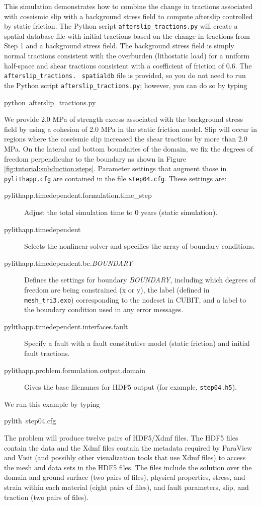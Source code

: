 This simulation demonstrates how to combine the change in tractions
associated with coseismic slip with a background stress field to compute
afterslip controlled by static friction. The Python script \texttt{afterslip\_tractions.py}
will create a spatial database file with initial tractions based on
the change in tractions from Step 1 and a background stress field.
The background stress field is simply normal tractions consistent
with the overburden (lithostatic load) for a uniform half-space and
shear tractions consistent with a coefficient of friction of 0.6.
The \texttt{afterslip\_tractions.}~\linebreak{}
\texttt{spatialdb} file is provided, so you do not need to run the
Python script \texttt{afterslip\_tractions.py}; however, you can do
so by typing
\begin{lyxcode}
python~afterslip\_tractions.py
\end{lyxcode}
We provide 2.0 MPa of strength excess associated with the background
stress field by using a cohesion of 2.0 MPa in the static friction
model. Slip will occur in regions where the coseismic slip increased
the shear tractions by more than 2.0 MPa. On the lateral and bottom
boundaries of the domain, we fix the degrees of freedom perpendicular
to the boundary as shown in Figure \vref{fig:tutorial:subduction:steps}.
Parameter settings that augment those in \texttt{pylithapp.cfg} are
contained in the file \texttt{step04.cfg}. These settings are:
\begin{description}
\item [{pylithapp.timedependent.formulation.time\_step}] Adjust the total
simulation time to 0 years (static simulation).
\item [{pylithapp.timedependent}] Selects the nonlinear solver and specifies
the array of boundary conditions.
\item [{pylithapp.timedependent.bc.\textit{BOUNDARY}}] Defines the settings
for boundary \textit{BOUNDARY}, including which degrees of freedom
are being constrained (x or y), the label (defined in\texttt{ mesh\_tri3.exo})
corresponding to the nodeset in CUBIT, and a label to the boundary
condition used in any error messages.
\item [{pylithapp.timedependent.interfaces.fault}] Specify a fault with
a fault constitutive model (static friction) and initial fault tractions. 
\item [{pylithapp.problem.formulation.output.domain}] Gives the base filenames
for HDF5 output (for example, \texttt{step04.h5}).
\end{description}
We run this example by typing
\begin{lyxcode}
pylith~step04.cfg
\end{lyxcode}
The problem will produce twelve pairs of HDF5/Xdmf files. The HDF5
files contain the data and the Xdmf files contain the metadata required
by ParaView and Visit (and possibly other visualization tools that
use Xdmf files) to access the mesh and data sets in the HDF5 files.
The files include the solution over the domain and ground surface
(two pairs of files), physical properties, stress, and strain within
each material (eight pairs of files), and fault parameters, slip,
and traction (two pairs of files). 

